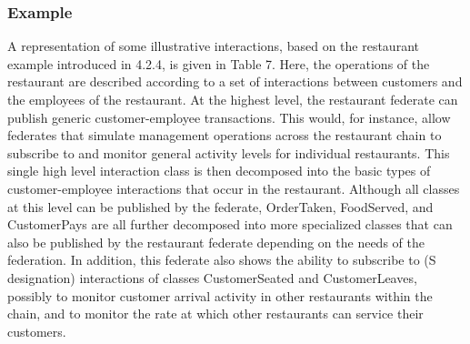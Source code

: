 \subsubsection{Example}
A representation of some illustrative interactions, based on the restaurant example introduced in 4.2.4, is given in Table 7. Here, the operations of the restaurant are described according to a set of interactions between customers and the employees of the restaurant. At the highest level, the restaurant federate can publish generic customer-employee transactions. This would, for instance, allow federates that simulate management operations across the restaurant chain to subscribe to and monitor general activity levels for individual restaurants. This single high level interaction class is then decomposed into the basic types of customer-employee interactions that occur in the restaurant. Although all classes at this level can be published by the federate, OrderTaken, FoodServed, and CustomerPays are all further decomposed into more specialized classes that can also be published by the restaurant federate depending on the needs of the federation. In addition, this federate also shows the ability to subscribe to (S designation) interactions of classes CustomerSeated and CustomerLeaves, possibly to monitor customer arrival activity in other restaurants within the chain, and to monitor the rate at which other restaurants can service their customers.

